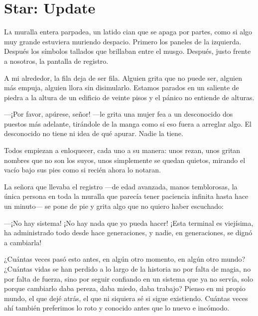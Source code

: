\renewcommand{\chaptertitlename}{Chapter}
\chapter{Star: Update}
\renewcommand{\chaptertitlename}{Capítulo}


\lettrine{L}{a} muralla entera parpadea, un latido cian que se apaga por partes, como si algo muy grande estuviera muriendo despacio. Primero los paneles de la izquierda. Después los símbolos tallados que brillaban entre el musgo. Después, justo frente a nosotros, la pantalla de registro.

A mi alrededor, la fila deja de ser fila. Alguien grita que no puede ser, alguien más empuja, alguien llora sin disimularlo. Estamos parados en un saliente de piedra a la altura de un edificio de veinte pisos y el pánico no entiende de alturas.

—¡Por favor, apúrese, señor! —le grita una mujer fea a un desconocido dos puestos más adelante, tirándole de la manga como si eso fuera a arreglar algo. El desconocido no tiene ni idea de qué apurar. Nadie la tiene.

Todos empiezan a enloquecer, cada uno a su manera: unos rezan, unos gritan nombres que no son los suyos, unos simplemente se quedan quietos, mirando el vacío bajo sus pies como si recién ahora lo notaran.

La señora que llevaba el registro —de edad avanzada, manos temblorosas, la única persona en toda la muralla que parecía tener paciencia infinita hasta hace un minuto— se pone de pie y grita algo que no quiero haber escuchado:

—¡No hay sistema! ¡No hay nada que yo pueda hacer! ¡Esta terminal es viejísima, ha administrado todo desde hace generaciones, y nadie, en generaciones, se dignó a cambiarla!

¿Cuántas veces pasó esto antes, en algún otro momento, en algún otro mundo? ¿Cuántas vidas se han perdido a lo largo de la historia no por falta de magia, no por falta de fuerza, sino por seguir confiando en un sistema que ya no servía, solo porque cambiarlo daba pereza, daba miedo, daba trabajo? Pienso en mi propio mundo, el que dejé atrás, el que ni siquiera sé si sigue existiendo. Cuántas veces ahí también preferimos lo roto y conocido antes que lo nuevo e incómodo.


